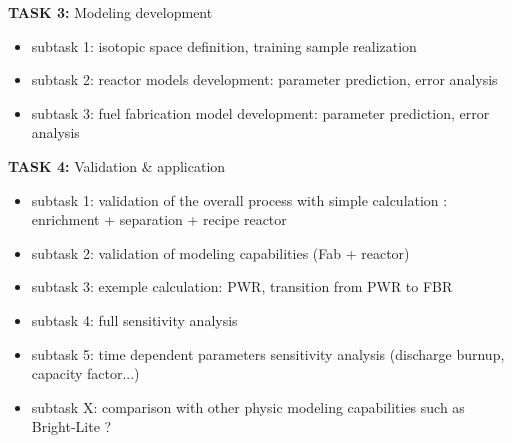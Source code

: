 \documentclass[dvips,12pt]{article}
\begin{document}
\noindent\textbf{TASK 3:} Modeling development
\begin{itemize}
\item subtask 1: isotopic space definition,
  training sample realization
\item subtask 2: reactor models development:
  parameter prediction, error analysis
\item subtask 3: fuel fabrication model
  development: parameter prediction, error
  analysis
\end{itemize}
 
\noindent\textbf{TASK 4:} Validation \& application
\begin{itemize}
\item subtask 1: validation of the overall process
  with simple calculation : enrichment +
  separation + recipe reactor
\item subtask 2: validation of modeling
  capabilities (Fab + reactor)

\item subtask 3: exemple calculation: PWR,
  transition from PWR to FBR
\item subtask 4: full sensitivity analysis

\item subtask 5: time dependent parameters
  sensitivity analysis (discharge burnup, capacity
  factor...)

\item subtask X: comparison with other physic
  modeling capabilities such as Bright-Lite ?
\end{itemize}






 












\end{document}

